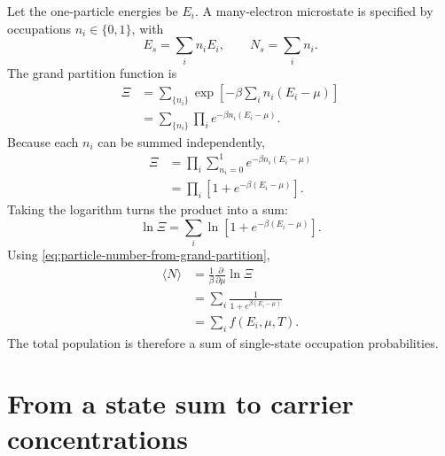 Let the one-particle energies be $E_i$.  A many-electron microstate is specified
by occupations $n_i\in\{0,1\}$, with
\begin{equation}
  E_s=\sum_i n_iE_i,
  \qquad
  N_s=\sum_i n_i.
  \label{eq:independent-fermion-microstate-energy-number}
\end{equation}
The grand partition function is
\begin{equation}
\begin{aligned}
  \Xi
  &=\sum_{\{n_i\}}
    \exp\left[-\beta\sum_i n_i(E_i-\mu)\right]\\
  &=\sum_{\{n_i\}}
    \prod_i e^{-\beta n_i(E_i-\mu)}.
\end{aligned}
  \label{eq:many-fermion-grand-sum}
\end{equation}
Because each $n_i$ can be summed independently,
\begin{equation}
\begin{aligned}
  \Xi
  &=\prod_i\sum_{n_i=0}^{1}
    e^{-\beta n_i(E_i-\mu)}\\
  &=\boxed{
    \prod_i\left[1+e^{-\beta(E_i-\mu)}\right]}.
\end{aligned}
  \label{eq:ideal-fermion-grand-partition-product}
\end{equation}
Taking the logarithm turns the product into a sum:
\begin{equation}
  \ln\Xi
  =\sum_i\ln\left[1+e^{-\beta(E_i-\mu)}\right].
  \label{eq:log-grand-partition-fermions}
\end{equation}
Using \cref{eq:particle-number-from-grand-partition},
\begin{equation}
\begin{aligned}
  \langle N\rangle
  &=\frac{1}{\beta}
    \frac{\partial}{\partial\mu}\ln\Xi\\
  &=\sum_i\frac{1}{1+e^{\beta(E_i-\mu)}}\\
  &=\sum_i f(E_i,\mu,T).
\end{aligned}
  \label{eq:particle-number-sum-of-fermi-occupations}
\end{equation}
The total population is therefore a sum of single-state occupation
probabilities.

\section{From a state sum to carrier concentrations}

